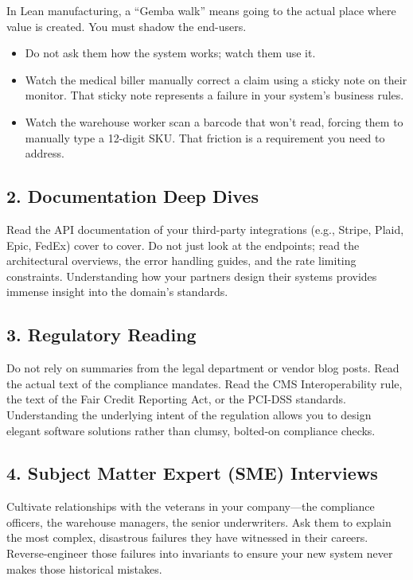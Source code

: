 \documentclass[
  11pt,
  openany,
  oneside]{book}
\providecommand{\tightlist}{%
  \setlength{\itemsep}{0pt}\setlength{\parskip}{0pt}}
\begin{document}
In Lean manufacturing, a ``Gemba walk'' means going to the actual place
where value is created. You must shadow the end-users.

\begin{itemize}
\tightlist
\item
  Do not ask them how the system works; watch them use it.
\item
  Watch the medical biller manually correct a claim using a sticky note
  on their monitor. That sticky note represents a failure in your
  system's business rules.
\item
  Watch the warehouse worker scan a barcode that won't read, forcing
  them to manually type a 12-digit SKU. That friction is a requirement
  you need to address.
\end{itemize}

\subsection{2. Documentation Deep Dives}\label{documentation-deep-dives}

Read the API documentation of your third-party integrations (e.g.,
Stripe, Plaid, Epic, FedEx) cover to cover. Do not just look at the
endpoints; read the architectural overviews, the error handling guides,
and the rate limiting constraints. Understanding how your partners
design their systems provides immense insight into the domain's
standards.

\subsection{3. Regulatory Reading}\label{regulatory-reading}

Do not rely on summaries from the legal department or vendor blog posts.
Read the actual text of the compliance mandates. Read the CMS
Interoperability rule, the text of the Fair Credit Reporting Act, or the
PCI-DSS standards. Understanding the underlying intent of the regulation
allows you to design elegant software solutions rather than clumsy,
bolted-on compliance checks.

\subsection{4. Subject Matter Expert (SME)
Interviews}\label{subject-matter-expert-sme-interviews}

Cultivate relationships with the veterans in your company---the
compliance officers, the warehouse managers, the senior underwriters.
Ask them to explain the most complex, disastrous failures they have
witnessed in their careers. Reverse-engineer those failures into
invariants to ensure your new system never makes those historical
mistakes.
\end{document}
